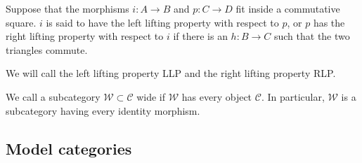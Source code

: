 \documentclass[../thesis.tex]{subfiles}
\begin{document}
        \begin{definition}
            Suppose that the morphisms $i: A \rightarrow B$ and $p: C \rightarrow D$ fit inside a commutative square. $i$ is said to have the left lifting property with respect to $p$, or $p$ has the right lifting property with respect to $i$ if there is an $h: B \rightarrow C$ such that the two triangles commute.
            \begin{center}
            \end{center}
        \end{definition}

        \begin{remark}
            We will call the left lifting property LLP and the right lifting property RLP.
        \end{remark}

        \begin{definition}
            We call a subcategory $\mathcal{W} \subset \mathcal{C}$ wide if $\mathcal{W}$ has every object $\mathcal{C}$. In particular, $\mathcal{W}$ is a subcategory having every identity morphism.
        \end{definition}

        \subsection{Model categories}
\end{document}
